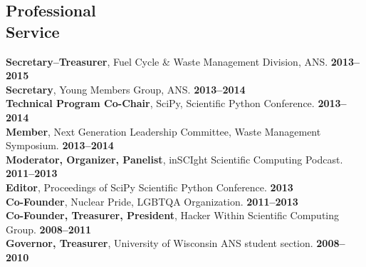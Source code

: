 \documentclass[margin,line]{resume}
\begin{document}
\begin{resume}
    \section{\mysidestyle Professional\\Service}
		\textbf{Secretary--Treasurer}, Fuel Cycle \& Waste Management Division, ANS. \hfill \textbf{2013--2015}\vspace{.5mm}\\%
		\textbf{Secretary}, Young Members Group, ANS. \hfill \textbf{2013--2014}\vspace{.5mm}\\%
		\textbf{Technical Program Co-Chair}, SciPy, Scientific Python Conference.  \hfill \textbf{2013--2014}\vspace{.5mm}\\%
		\textbf{Member}, Next Generation Leadership Committee, Waste Management Symposium. \hfill \textbf{2013--2014}\vspace{.5mm}\\%
		\textbf{Moderator, Organizer, Panelist}, inSCIght Scientific Computing Podcast. \hfill \textbf{2011--2013}\vspace{.5mm}\\%
		\textbf{Editor}, Proceedings of SciPy Scientific Python Conference.  \hfill \textbf{2013}\vspace{.5mm}\\%
		\textbf{Co-Founder}, Nuclear Pride, LGBTQA Organization. \hfill \textbf{2011--2013}\vspace{.5mm}\\%
		\textbf{Co-Founder, Treasurer, President}, Hacker Within Scientific Computing Group. \hfill \textbf{2008--2011}\vspace{.5mm}\\%
		\textbf{Governor, Treasurer}, University of Wisconsin ANS student section. \hfill \textbf{2008--2010}\vspace{.5mm}\\%


\end{resume}
\end{document}
